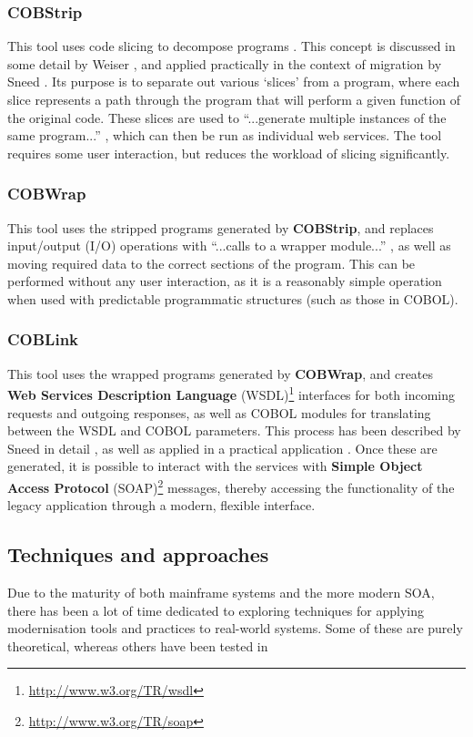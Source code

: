 \documentclass[12pt,journal,compsoc]{IEEEtran}
\begin{document}
\subsubsection{COBStrip}
\label{subsubsec:cobstrip}
This tool uses code slicing to decompose programs \cite{Canfora2000}. This concept is discussed in some detail by Weiser \cite{Weiser1984}, and applied practically in the context of migration by Sneed \cite{Sneed2009,Sneed2008}. Its purpose is to separate out various `slices' from a program, where each slice represents a path through the program that will perform a given function of the original code. These slices are used to ``...generate multiple instances of the same program...'' \cite{Sneed2009,Sneed2008}, which can then be run as individual web services. The tool requires some user interaction, but reduces the workload of slicing significantly.

\subsubsection{COBWrap}
\label{subsubsec:cobwrap}
This tool uses the stripped programs generated by \textbf{COBStrip}, and replaces input/output (I/O) operations with ``...calls to a wrapper module...'' \cite{Sneed2009,Sneed2008}, as well as moving required data to the correct sections of the program. This can be performed without any user interaction, as it is a reasonably simple operation when used with predictable programmatic structures (such as those in COBOL).

\subsubsection{COBLink}
\label{subsubsec:coblink}
This tool uses the wrapped programs generated by \textbf{COBWrap}, and creates \textbf{Web Services Description Language} (WSDL)\footnote{\url{http://www.w3.org/TR/wsdl}} interfaces for both incoming requests and outgoing responses, as well as COBOL modules for translating between the WSDL and COBOL parameters. This process has been described by Sneed in detail \cite{Sneed2001}, as well as applied in a practical application \cite{Sneed2009,Sneed2008}. Once these are generated, it is possible to interact with the services with \textbf{Simple Object Access Protocol} (SOAP)\footnote{\url{http://www.w3.org/TR/soap}} messages, thereby accessing the functionality of the legacy application through a modern, flexible interface.

\subsection{Techniques and approaches}
\label{subsec:techniques}
Due to the maturity of both mainframe systems and the more modern SOA, there has been a lot of time dedicated to exploring techniques for applying modernisation tools and practices to real-world systems. Some of these are purely theoretical, whereas others have been tested in
\end{document}
